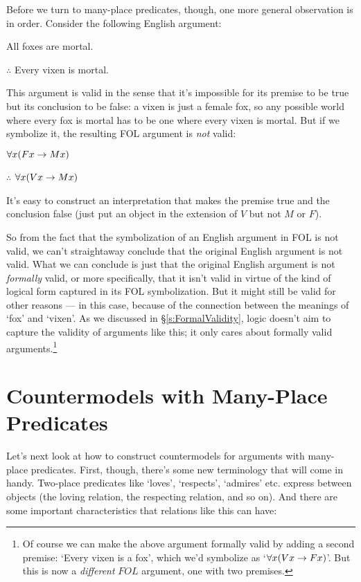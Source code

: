 Before we turn to many-place predicates, though, one more general observation is in order.  Consider the following English argument:
\begin{earg}
	\item[] All foxes are mortal.
	\item[$\therefore$] Every vixen is mortal.
\end{earg}
This argument is valid in the sense that it's impossible for its premise to be true but its conclusion to be false: a vixen is just a female fox, so any possible world where every fox is mortal has to be one where every vixen is mortal.  But if we symbolize it, the resulting FOL argument is \emph{not} valid:
\begin{earg}
	\item[] $\forall x(Fx \rightarrow Mx)$
	\item[$\therefore$] $\forall x(Vx \rightarrow Mx)$
\end{earg}
It's easy to construct an interpretation that makes the premise true and the conclusion false (just put an object in the extension of $V$ but not $M$ or $F$).

So from the fact that the symbolization of an English argument in FOL is not valid, we can't straightaway conclude that the original English argument is not valid.   What we can conclude is just that the original English argument is not \emph{formally} valid, or more specifically, that it isn't valid in virtue of the kind of logical form captured in its FOL symbolization.  But it might still be valid for other reasons --- in this case, because of the connection between the meanings of `fox' and `vixen'.  As we discussed in \S\ref{s:FormalValidity}, logic doesn't aim to capture the validity of arguments like this; it only cares about formally valid arguments.\footnote{Of course we can make the above argument formally valid by adding a second premise: `Every vixen is a fox', which we'd symbolize as `$\forall x(Vx \rightarrow Fx)$'.  But this is now a \emph{different}  $FOL$ argument, one with two premises.}

\section{Countermodels with Many-Place Predicates}

Let's next look at how to construct countermodels for arguments with many-place predicates.  First, though, there's some new terminology that will come in handy.  Two-place predicates like `loves', `respects', `admires' etc. express  between objects (the loving relation, the respecting relation, and so on).  And there are some important characteristics that relations like this can have:

